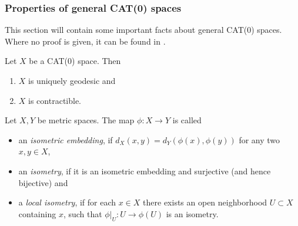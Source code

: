 
\subsubsection*{Properties of general CAT(0) spaces}

This section will contain some important facts about general CAT(0) spaces. Where no proof is given, it can be found in \cite{MR1744486}.

\begin{prop}[{\cite[Prop II.1.4]{MR1744486}}]
  Let \(X\) be a CAT(0) space. Then
  \begin{enumerate}
  \item \(X\) is uniquely geodesic and
  \item \(X\) is contractible.
  \end{enumerate}
\end{prop}

\begin{defin}
  Let \(X,Y\) be metric spaces. The map \(\phi \colon X \to Y\) is called
  \begin{itemize}
  \item an \emph{isometric embedding}, if \(d_X(x,y) = d_Y(\phi(x), \phi(y))\) for any two \(x,y \in X\),
  \item an \emph{isometry}, if it is an isometric embedding and surjective (and hence bijective) and
  \item a \emph{local isometry}, if for each \(x \in X\) there exists an open neighborhood \(U \subset X\) containing \(x\), such that \(\phi|_U \colon U \to \phi(U)\) is an isometry.
  \end{itemize}
\end{defin}

